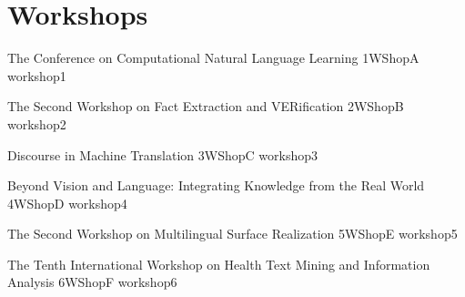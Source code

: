 \chapter[Workshops: \daydate]{Workshops}
\thispagestyle{emptyheader}
\vfill




\clearpage
{}

      \begin{wsschedule}
      {The Conference on Computational Natural Language Learning}
      {1}{WShopA}
      {workshop1}
      {\WShopLocA}
      
      \end{wsschedule}
      


\begin{wsschedule}
 {The Second Workshop on Fact Extraction and VERification}
 {2}{WShopB}
 {workshop2}
 {\WShopLocB}
 
\end{wsschedule}
      
\begin{wsschedule}
 {Discourse in Machine Translation}
 {3}{WShopC}
 {workshop3}
 {\WShopLocC}
 
\end{wsschedule}

\begin{wsschedule}
 {Beyond Vision and Language: Integrating Knowledge from the Real World}
 {4}{WShopD}
 {workshop4}
 {\WShopLocD}
 
\end{wsschedule}

\begin{wsschedule}
 {The Second Workshop on Multilingual Surface Realization}
 {5}{WShopE}
 {workshop5}
 {\WShopLocE}
 
\end{wsschedule}

\begin{wsschedule}
 {The Tenth International Workshop on Health Text Mining and Information Analysis}
 {6}{WShopF}
 {workshop6}
 {\WShopLocF}
 
\end{wsschedule}


